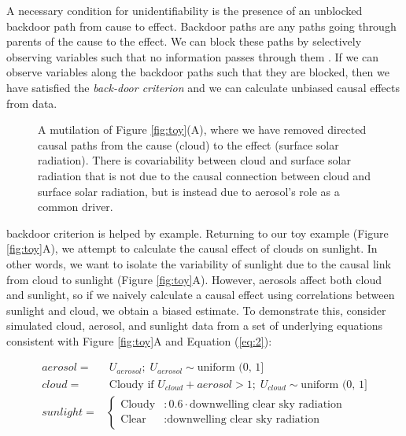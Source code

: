 \documentclass[12pt]{article}
\begin{document}

A necessary condition for unidentifiability is the presence of an
unblocked backdoor path from cause to effect. Backdoor paths are any
paths going through parents of the cause to the effect. We can block
these paths by selectively observing variables such that no
information passes through them \citep{geiger-d-sep}. If we can
observe variables along the backdoor paths such that they are blocked,
then we have satisfied the \emph{back-door criterion}
\citep{pearl2009} and we can calculate unbiased causal effects from
data.

\begin{figure} 
  \caption{A mutilation of Figure \ref{fig:toy}(A), where we have
    removed directed causal paths from the cause (cloud) to the effect
    (surface solar radiation). There is covariability between cloud and
    surface solar radiation that is not due to the causal connection
    between cloud and surface solar radiation, but is instead due to
    aerosol's role as a common driver.}
  \label{fig:mutilated-toy}
\end{figure}

backdoor criterion is helped by example. Returning to our toy example
(Figure \ref{fig:toy}A), we attempt to calculate the causal effect of
clouds on sunlight. In other words, we want to isolate the variability
of sunlight due to the causal link from cloud to sunlight (Figure
\ref{fig:toy}A). However, aerosols affect both cloud and sunlight, so
if we naively calculate a causal effect using correlations between
sunlight and cloud, we obtain a biased estimate. To demonstrate this,
consider simulated cloud, aerosol, and sunlight data from a set of
underlying equations consistent with Figure \ref{fig:toy}A and
Equation (\ref{eq:2}):


\begin{align} aerosol =& \; U_{aerosol}; \; U_{aerosol} \sim
                         \text{uniform (0, 1]}\\ cloud =& \; \text{Cloudy if } U_{cloud} +
                                                          aerosol > 1; \; U_{cloud} \sim \text{uniform (0, 1]}\\ sunlight
  =& \begin{cases} \text{Cloudy} &: 0.6 \cdot \text{downwelling clear
      sky radiation} \\ \text{Clear} &: \text{downwelling clear sky
      radiation}
  \end{cases}
                                       \label{eq:1}
\end{align}
\end{document}
